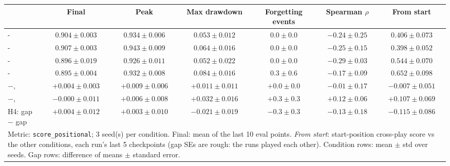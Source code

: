 \begin{tabular}{lcccccc}
\toprule
 & Final & Peak & Max drawdown & Forgetting events & Spearman $\rho$ & From start \\
\midrule
\envT{}-\naiveS{} & $0.904 \pm 0.003$ & $0.934 \pm 0.006$ & $0.053 \pm 0.012$ & $0.0 \pm 0.0$ & $-0.24 \pm 0.25$ & $0.406 \pm 0.073$ \\
\envT{}-\poolS{} & $0.907 \pm 0.003$ & $0.943 \pm 0.009$ & $0.064 \pm 0.016$ & $0.0 \pm 0.0$ & $-0.25 \pm 0.15$ & $0.398 \pm 0.052$ \\
\negT{}-\naiveS{} & $0.896 \pm 0.019$ & $0.926 \pm 0.011$ & $0.052 \pm 0.022$ & $0.0 \pm 0.0$ & $-0.29 \pm 0.03$ & $0.544 \pm 0.070$ \\
\negT{}-\poolS{} & $0.895 \pm 0.004$ & $0.932 \pm 0.008$ & $0.084 \pm 0.016$ & $0.3 \pm 0.6$ & $-0.17 \pm 0.09$ & $0.652 \pm 0.098$ \\
\midrule
\poolS{}$-$\naiveS{}, \envT{} & $+0.004 \pm 0.003$ & $+0.009 \pm 0.006$ & $+0.011 \pm 0.011$ & $+0.0 \pm 0.0$ & $-0.01 \pm 0.17$ & $-0.007 \pm 0.051$ \\
\poolS{}$-$\naiveS{}, \negT{} & $-0.000 \pm 0.011$ & $+0.006 \pm 0.008$ & $+0.032 \pm 0.016$ & $+0.3 \pm 0.3$ & $+0.12 \pm 0.06$ & $+0.107 \pm 0.069$ \\
H4: \envT{} gap $-$ \negT{} gap & $+0.004 \pm 0.012$ & $+0.003 \pm 0.010$ & $-0.021 \pm 0.019$ & $-0.3 \pm 0.3$ & $-0.13 \pm 0.18$ & $-0.115 \pm 0.086$ \\
\bottomrule
\multicolumn{7}{l}{\footnotesize Metric: \texttt{score\_positional}; 3 seed(s) per condition. Final: mean of the last 10 eval points. \emph{From start}: start-position cross-play score vs the other conditions, each run's last 5 checkpoints (gap SEs are rough: the runs played each other). Condition rows: mean $\pm$ std over seeds. Gap rows: difference of means $\pm$ standard error.}
\end{tabular}
